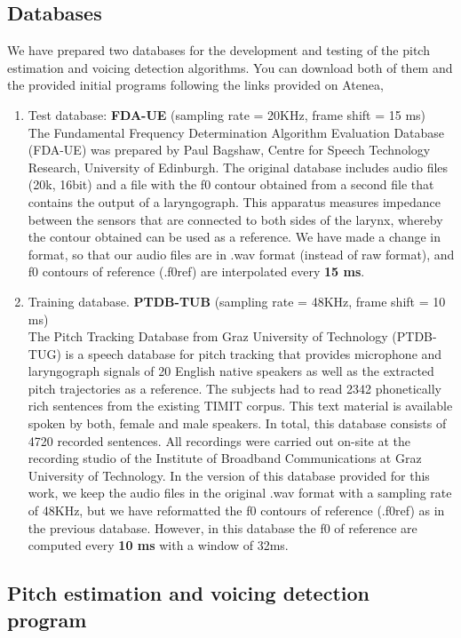 \documentclass[a4paper,11pt]{article}
\begin{document}
\subsection*{Databases}
We have prepared two databases for the development and testing of the pitch estimation and voicing detection algorithms. You can download both of them and the provided initial programs following the links provided on Atenea,

\begin{enumerate}
\item Test database: \textbf{FDA-UE} (sampling rate = 20KHz, frame shift = 15 ms)\\
The Fundamental Frequency Determination Algorithm Evaluation Database (FDA-UE) was prepared by Paul Bagshaw, Centre for Speech Technology Research, University of Edinburgh. The original database includes audio files (20k, 16bit) and a file with the f0 contour obtained from a second file that contains the output of a laryngograph. This apparatus measures impedance between the sensors that are connected to both sides of the larynx, whereby the contour obtained can be used as a reference. We have made a change in format, so that our audio files are in .wav format (instead of raw format), and f0 contours of reference (.f0ref) are interpolated every \textbf{15 ms}.
\item Training database. \textbf{PTDB-TUB} (sampling rate = 48KHz, frame shift = 10 ms)\\
The Pitch Tracking Database from Graz University of Technology (PTDB-TUG) is a speech database for pitch tracking that provides microphone and laryngograph signals of 20 English native speakers as well as the extracted pitch trajectories as a reference. The subjects had to read 2342 phonetically rich sentences from the existing TIMIT corpus. This text material is available spoken by both, female and male speakers. In total, this database consists of 4720 recorded sentences. All recordings were carried out on-site at the recording studio of the Institute of Broadband Communications at Graz University of Technology. In the version of this database provided for this work, we keep the audio files in the original .wav format with a sampling rate of 48KHz, but we have reformatted the f0 contours of reference (.f0ref) as in the previous database. However, in this database the f0 of reference are computed every \textbf{10 ms} with a window of 32ms.
\end{enumerate}


\subsection*{Pitch estimation and voicing detection program}
\end{document}
